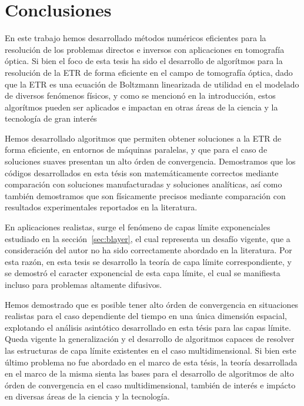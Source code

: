 \chapter{Conclusiones}
\lhead{\thepage}
\vspace{0.01\textheight}
\pagebreak
En este trabajo hemos desarrollado métodos numéricos eficientes 
para la resolución de los problemas directos e inversos con 
aplicaciones en tomografía óptica. 
Si bien el foco de esta tesis ha sido el desarrollo de algorítmos 
para la resolución de la ETR de forma eficiente en el campo 
de tomografía óptica, 
dado que la ETR es una ecuación de Boltzmann 
linearizada de utilidad en el modelado de diversos 
fenómenos físicos, y como se mencionó en la introducción, estos algorítmos pueden ser aplicados e impactan 
en otras áreas de la ciencia y la tecnología de gran interés~\cite{Howell2010, Thynell1998,Duderstadt1979,Qin2015,Dymond1997,Chandrasekhar1960,Zhu2005,Zhu2010,Vassiliev2010,Bedford2019,Vassiliev2010,Bedford2019,Larsen2006, Sanchez1982, Anli2006,Mishchenko1999, Prasher2003}

 Hemos desarrollado algoritmos que permiten obtener soluciones 
 a la ETR de forma eficiente, en entornos de máquinas paralelas, 
 y que para el caso de soluciones suaves presentan un alto órden de convergencia. 
 Demostramos que los códigos desarrollados en esta tésis son matemáticamente 
 correctos mediante comparación con soluciones manufacturadas y soluciones 
 analíticas, así como también demostramos que son físicamente 
 precisos mediante comparación con resultados experimentales 
 reportados en la literatura.
 
 En aplicaciones realistas, surge el fenómeno de capas límite exponenciales 
 estudiado en la sección~\ref{sec:blayer}, el cual representa un desafío 
 vigente, que a consideración del autor no ha sido correctamente 
 abordado en la literatura. Por esta razón, en esta tesis 
 se desarrollo la teoría de capa límite correspondiente, y se demostró 
 el caracter exponencial de esta capa límite, el cual se manifiesta 
 incluso para problemas altamente difusivos.
 
 Hemos demostrado que es posible 
 tener alto órden de convergencia en situaciones realistas para 
 el caso dependiente del tiempo en una única dimensión espacial, 
 explotando el análisis asintótico desarrollado en esta tésis para las capas límite. 
 Queda vigente la generalización y el desarrollo de algoritmos capaces 
 de resolver las estructuras de capa límite existentes en el caso 
 multidimensional. Si bien este último problema no fue abordado en el marco de esta tésis, 
 la teoría desarrollada en el marco de la misma sienta las bases 
 para el desarrollo de algoritmos de alto órden de convergencia en el 
 caso multidimensional, también de interés e impácto en diversas 
 áreas de la ciencia y la tecnología. 
 
